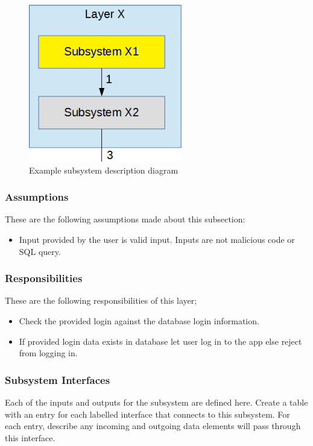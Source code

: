 \begin{figure}[h!]
	\centering
 	\includegraphics[width=0.60\textwidth]{images/subsystem}
 \caption{Example subsystem description diagram}
\end{figure}

\subsubsection{Assumptions}
These are the following assumptions made about this subsection:
\begin{itemize}
    \item Input provided by the user is valid input. Inputs are not malicious code or SQL query.
\end{itemize}

\subsubsection{Responsibilities}
These are the following responsibilities of this layer;
\begin{itemize}
    \item Check the provided login against the database login information.
    \item If provided login data exists in database let user log in to the app else reject from logging in.
\end{itemize}

\subsubsection{Subsystem Interfaces}
Each of the inputs and outputs for the subsystem are defined here. Create a table with an entry for each labelled interface that connects to this subsystem. For each entry, describe any incoming and outgoing data elements will pass through this interface.

